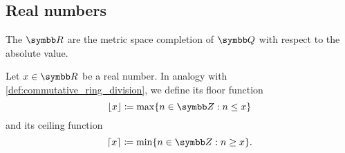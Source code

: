 \subsection{Real numbers}\label{subsec:real_numbers}

\begin{definition}\label{def:real_numbers}
  The  \( \R \) are the metric space completion of \( \Q \) with respect to the absolute value.
\end{definition}

\begin{definition}\label{def:floor_ceiling_functions}
  Let \( x \in \R \) be a real number. In analogy with \cref{def:commutative_ring_division}, we define its floor function
  \begin{equation*}
    \lfloor x \rfloor \coloneqq \max \{ n \in \Z : n \leq x \}
  \end{equation*}
  and its ceiling function
  \begin{equation*}
    \lceil x \rceil \coloneqq \min \{ n \in \Z : n \geq x \}.
  \end{equation*}
\end{definition}
